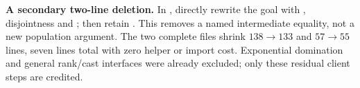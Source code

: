 \textbf{A secondary two-line deletion.} In , directly rewrite the goal with , disjointness and ; then retain . This removes a named intermediate equality, not a new population argument. The two complete files shrink $138\to133$ and $57\to55$ lines, seven lines total with zero helper or import cost. Exponential domination and general rank/cast interfaces were already excluded; only these residual client steps are credited.
